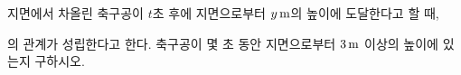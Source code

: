 지면에서 차올린 축구공이 $t$초 후에 지면으로부터 $y\mkern3mu \mathrm{m}$의 높이에 도달한다고 할 때,\par\smallskip{}\par\smallskip\noindent 의 관계가 성립한다고 한다. 축구공이 몇 초 동안 지면으로부터 $3\mkern3mu \mathrm{m}$ 이상의 높이에 있는지 구하시오.
